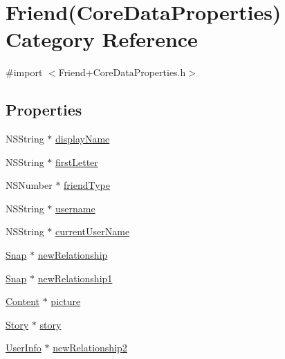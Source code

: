 \hypertarget{category_friend_07_core_data_properties_08}{}\section{Friend(Core\+Data\+Properties) Category Reference}
\label{category_friend_07_core_data_properties_08}


{\ttfamily \#import $<$Friend+\+Core\+Data\+Properties.\+h$>$}

\subsection*{Properties}
\begin{DoxyCompactItemize}
\item 
N\+S\+String $\ast$ \hyperlink{category_friend_07_core_data_properties_08_af2d591348fcf61fa68c3a991b794a6cd}{display\+Name}
\item 
N\+S\+String $\ast$ \hyperlink{category_friend_07_core_data_properties_08_a773cce0b5e88fefea9cb4d62b0e14ee7}{first\+Letter}
\item 
N\+S\+Number $\ast$ \hyperlink{category_friend_07_core_data_properties_08_ae34ab7d4224991623c5c7eb4d99447b2}{friend\+Type}
\item 
N\+S\+String $\ast$ \hyperlink{category_friend_07_core_data_properties_08_a5c8f12e6c2a6b9a34937ad9aa4b44335}{username}
\item 
N\+S\+String $\ast$ \hyperlink{category_friend_07_core_data_properties_08_af0b327014ff4dbb0321064ae83b0aa0e}{current\+User\+Name}
\item 
\hyperlink{interface_snap}{Snap} $\ast$ \hyperlink{category_friend_07_core_data_properties_08_ac4ba0849d86d274096859f2bffb3d6cd}{new\+Relationship}
\item 
\hyperlink{interface_snap}{Snap} $\ast$ \hyperlink{category_friend_07_core_data_properties_08_adc99c356248c02d3cd745e3d63e9ca38}{new\+Relationship1}
\item 
\hyperlink{interface_content}{Content} $\ast$ \hyperlink{category_friend_07_core_data_properties_08_a3336d7f52482a6f2d5e03ca3381cc383}{picture}
\item 
\hyperlink{interface_story}{Story} $\ast$ \hyperlink{category_friend_07_core_data_properties_08_a9a9cc57998bfc84c236266545ea686a3}{story}
\item 
\hyperlink{interface_user_info}{User\+Info} $\ast$ \hyperlink{category_friend_07_core_data_properties_08_a2b53648385753601b289de99ae5c726e}{new\+Relationship2}
\end{DoxyCompactItemize}


